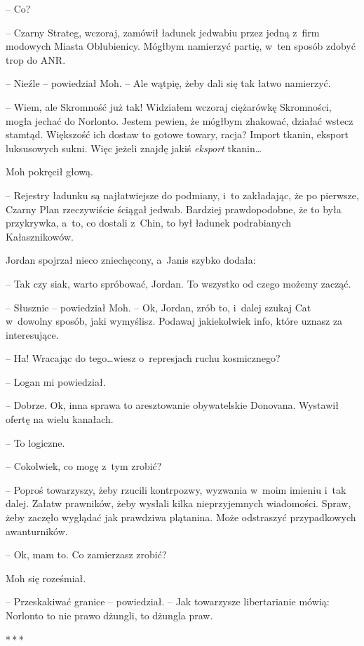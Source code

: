 \documentclass[oneside,polish,11pt,sfheadings]{mwbk}
\newcommand{\threeast}{\bigskip\par\centerline{*\,*\,*}\medskip\par}%
\begin{document}
-- Co?

-- Czarny Strateg, wczoraj, zamówił ładunek jedwabiu przez jedną z~firm
modowych Miasta Oblubienicy. Mógłbym namierzyć partię, w~ten sposób
zdobyć trop do ANR.

-- Nieźle -- powiedział Moh. -- Ale wątpię, żeby dali się tak łatwo
namierzyć.

-- Wiem, ale Skromność już tak! Widziałem wczoraj ciężarówkę Skromności,
mogła jechać do Norlonto. Jestem pewien, że mógłbym zhakować, działać
wstecz stamtąd. Większość ich dostaw to gotowe towary, racja? Import
tkanin, eksport luksusowych sukni. Więc jeżeli znajdę jakiś
\emph{eksport} tkanin\ldots

Moh pokręcił głową. 

-- Rejestry ładunku są najłatwiejsze do podmiany, i~to zakładając, że po pierwsze, Czarny Plan rzeczywiście ściągał jedwab.
Bardziej prawdopodobne, że to była przykrywka, a~to, co dostali z~Chin,
to był ładunek podrabianych Kałasznikowów.

Jordan spojrzał nieco zniechęcony, a~Janis szybko dodała: 

-- Tak czy
siak, warto spróbować, Jordan. To wszyst\-ko od czego możemy zacząć.

-- Słusznie -- powiedział Moh. -- Ok, Jordan, zrób to, i~dalej szukaj Cat w~dowolny sposób, jaki wymyślisz. Podawaj jakiekolwiek info, które uznasz
za interesujące.

-- Ha! Wracając do tego\ldots wiesz o~represjach ruchu kosmicznego?

-- Logan mi powiedział.

-- Dobrze. Ok, inna sprawa to aresztowanie obywatelskie Donovana.
Wystawił ofertę na wielu kanałach.

-- To logiczne.

-- Cokolwiek, co mogę z~tym zrobić?

-- Poproś towarzyszy, żeby rzucili kontrpozwy, wyzwania w~moim imieniu i~tak dalej. Załatw prawników, żeby wysłali kilka nieprzyjemnych
wiadomości. Spraw, żeby zaczęło wyglądać jak prawdziwa plątanina. Może
odstraszyć przypadkowych awanturników.

-- Ok, mam to. Co zamierzasz zrobić?

Moh się roześmiał. 

-- Przeskakiwać granice -- powiedział. -- Jak towarzysze
libertarianie mówią: Norlonto to nie prawo dżungli, to dżungla praw.
  \threeast 
\end{document}
